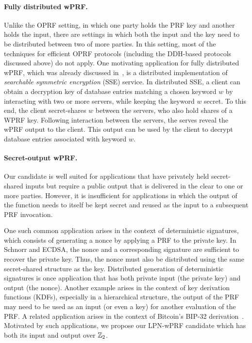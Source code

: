 \paragraph{Fully distributed wPRF.} Unlike the OPRF setting, in which one party holds the PRF key and another holds the input, there are settings in which both the input and the key need to be distributed between two of more parties. In this setting, most of the techniques for efficient OPRF protocols (including the DDH-based protocols discussed above) do not apply. 
One motivating application for fully distributed wPRF, which was already discussed in~\cite{boneh2018-darkmatter}, is a distributed implementation of {\em searchable symmetric encryption} (SSE) service. In distributed SSE, a client can obtain a decryption key of database entries matching a chosen keyword $w$ by interacting with two or more servers, while keeping the keyword $w$ secret.  To this end, the client secret-shares $w$ between the servers, who also hold shares of a WPRF key. Following interaction between the servers, the serves reveal the wPRF output to the client. This output can be used by the client to decrypt database entries associated with keyword $w$. 

\paragraph{Secret-output wPRF.} Our \ttwPRF candidate is well suited for applications that have privately held secret-shared inputs but require a public output that is delivered in the clear to one or more parties. However, it is insufficient for applications in which the output of the function needs to itself be kept secret and reused as the input to a subsequent PRF invocation.

One such common application arises in the context of deterministic signatures, which consists of generating a nonce by applying a PRF to the private key. In Schnorr and ECDSA, the nonce and a corresponding signature are sufficient to recover the private key. Thus, the nonce must also be distributed using the same secret-shared structure as the key. Distributed generation of deterministic signatures is once application that has both private input (the private key) and output (the nonce). Another example arises in the context of key derivation functions (KDFs), especially in a hierarchical structure, the output of the PRF may need to be used as an input (or even a key) for another evaluation of the PRF. A related application arises in the context of Bitcoin's BIP-32 derivation~\cite{bitcoin_bip0032}. Motivated by such applications, we propose our LPN-wPRF candidate which has both its input and output over $\mathbb{Z}_2$.

